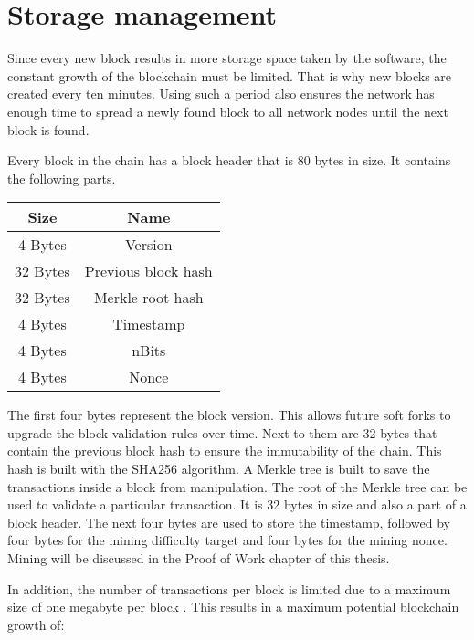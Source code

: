 \section{Storage management}

Since every new block results in more storage space taken by the software, the constant growth of the blockchain must be limited.
That is why new blocks are created every ten minutes. \cite{nakamoto2008}
Using such a period also ensures the network has enough time to spread a newly found block to all network nodes until the next block is found.

Every block in the chain has a block header that is 80 bytes in size.
It contains the following parts.

\begin{center}
    \begin{tabular}{|c c|} 
     \hline
     Size & Name \\ [0.5ex] 
     \hline
     4 Bytes & Version \\ [0.5ex] 
     \hline
     32 Bytes & Previous block hash \\ [0.5ex] 
     \hline
     32 Bytes & Merkle root hash \\ [0.5ex] 
     \hline
     4 Bytes & Timestamp \\ [0.5ex] 
     \hline
     4 Bytes & nBits \\ [0.5ex] 
     \hline
     4 Bytes & Nonce \\ [0.5ex] 
     \hline
    \end{tabular}
\end{center}

The first four bytes represent the block version. This allows future soft forks to upgrade the block validation rules over time.
Next to them are 32 bytes that contain the previous block hash to ensure the immutability of the chain. This hash is built with the SHA256 algorithm.
A Merkle tree is built to save the transactions inside a block from manipulation. The root of the Merkle tree can be used to validate a particular transaction.
It is 32 bytes in size and also a part of a block header.
The next four bytes are used to store the timestamp, followed by four bytes for the mining difficulty target and four bytes for the mining nonce. \cite{blockheaders}
Mining will be discussed in the Proof of Work chapter of this thesis.

In addition, the number of transactions per block is limited due to a maximum size of one megabyte per block \cite{8215367}.
This results in a maximum potential blockchain growth of:

